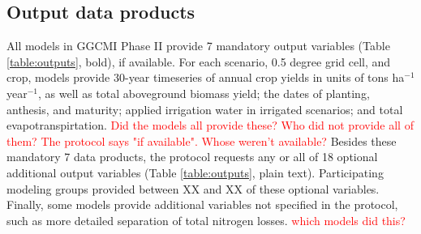 \documentclass[gmd, manuscript]{copernicus} %
\begin{document}
\subsection{Output data products}
All models in GGCMI Phase II provide 7 mandatory output variables (Table \ref{table:outputs}, bold), if available. For each scenario, 0.5 degree grid cell, and crop, models provide 30-year timeseries of annual crop yields in units of tons ha$^{-1}$ year$^{-1}$, as well as total aboveground biomass yield; the dates of planting, anthesis, and maturity; applied irrigation water in irrigated scenarios; and total evapotranspirtation. \textcolor{red}{Did the models all provide these? Who did not provide all of them? The protocol says "if available". Whose weren't available?}
  Besides these mandatory 7 data products, the protocol requests any or all of 18 optional additional output variables (Table \ref{table:outputs}, plain text).
Participating modeling groups provided between XX and XX of these optional variables. Finally, some models provide additional variables not specified in the protocol, such as more detailed separation of total nitrogen losses. \textcolor{red}{which models did this?}
\end{document}
